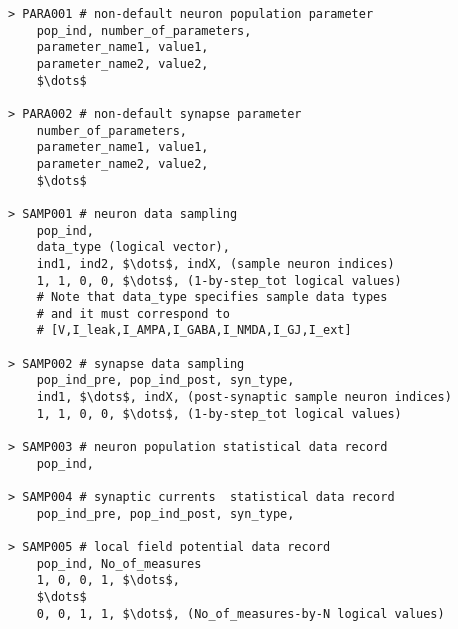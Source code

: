 \documentclass{article}
\begin{document}
\begin{lstlisting}[mathescape]
> PARA001 # non-default neuron population parameter
	pop_ind, number_of_parameters,
	parameter_name1, value1,
	parameter_name2, value2,
	$\dots$
 
> PARA002 # non-default synapse parameter
	number_of_parameters,
	parameter_name1, value1,
	parameter_name2, value2,
	$\dots$

> SAMP001 # neuron data sampling 
	pop_ind,
	data_type (logical vector),
	ind1, ind2, $\dots$, indX, (sample neuron indices)
	1, 1, 0, 0, $\dots$, (1-by-step_tot logical values)
	# Note that data_type specifies sample data types
	# and it must correspond to 
	# [V,I_leak,I_AMPA,I_GABA,I_NMDA,I_GJ,I_ext]

> SAMP002 # synapse data sampling 
	pop_ind_pre, pop_ind_post, syn_type,
	ind1, $\dots$, indX, (post-synaptic sample neuron indices)
	1, 1, 0, 0, $\dots$, (1-by-step_tot logical values)
	
> SAMP003 # neuron population statistical data record
	pop_ind,
	
> SAMP004 # synaptic currents  statistical data record
	pop_ind_pre, pop_ind_post, syn_type,

> SAMP005 # local field potential data record
	pop_ind, No_of_measures
	1, 0, 0, 1, $\dots$, 
	$\dots$
	0, 0, 1, 1, $\dots$, (No_of_measures-by-N logical values)
	
\end{lstlisting}
\end{document}
